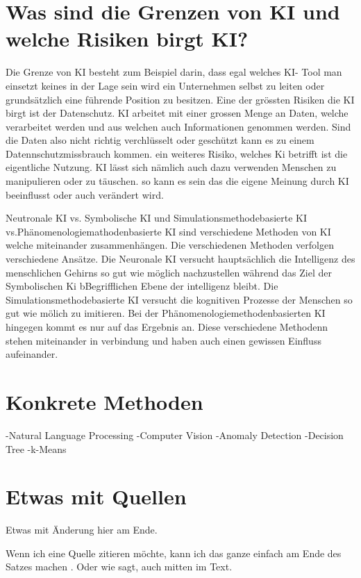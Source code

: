 \documentclass{report}
\begin{document}
\section{Was sind die Grenzen von KI und welche Risiken birgt KI?}
Die Grenze von KI besteht zum Beispiel darin, dass egal welches KI- Tool man einsetzt keines in der Lage sein wird ein Unternehmen selbst zu leiten oder grundsätzlich eine führende Position zu besitzen.
Eine der grössten Risiken die KI birgt ist der Datenschutz. KI arbeitet mit einer grossen Menge an Daten, welche verarbeitet werden und aus welchen auch Informationen genommen werden. 
Sind die Daten also nicht richtig verchlüsselt oder geschützt kann es zu einem Datennschutzmissbrauch kommen. 
ein weiteres Risiko, welches Ki betrifft ist die eigentliche Nutzung. KI lässt sich nämlich auch dazu verwenden Menschen zu manipulieren oder zu täuschen. 
so kann es sein das die eigene Meinung durch KI beeinflusst oder auch verändert wird. 

Neutronale KI vs. Symbolische KI  und Simulationsmethodebasierte KI vs.Phänomenologiemathodenbasierte KI sind verschiedene Methoden von KI welche miteinander zusammenhängen. 
Die verschiedenen Methoden verfolgen verschiedene Ansätze. Die Neuronale KI versucht hauptsächlich die Intelligenz des menschlichen Gehirns so gut wie möglich nachzustellen während das Ziel der Symbolischen Ki bBegrifflichen Ebene der intelligenz bleibt. 
Die Simulationsmethodebasierte KI versucht die kognitiven Prozesse der Menschen so gut wie mölich zu imitieren. Bei der Phänomenologiemethodenbasierten KI hingegen kommt es nur auf das Ergebnis an. 
Diese verschiedene Methodenn stehen miteinander in verbindung und haben auch einen gewissen Einfluss aufeinander. 

\section{Konkrete Methoden}
-Natural Language Processing
-Computer Vision
-Anomaly Detection
-Decision Tree 
-k-Means
\section{Etwas mit Quellen}

Etwas mit Änderung hier am Ende.

Wenn ich eine Quelle zitieren möchte, kann ich das ganze einfach am Ende des Satzes machen \citep{example}. Oder wie \citet{example} sagt, auch mitten im Text.

\printbibliography
\end{document}

